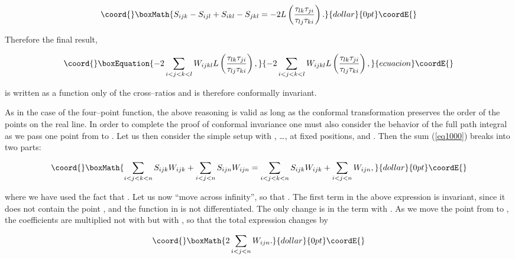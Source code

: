 \documentclass[a4paper,11pt]{article}
\begin{document}
$$\coord{}\boxMath{
S_{ijk}-S_{ijl}+S_{ikl}-S_{jkl}=-2L\left( \frac{\tau _{lk}\tau _{ji}}{\tau
_{lj}\tau _{ki}}\right) .
}{dollar}{0pt}\coordE{}$$

\noindent
Therefore the final result,

\begin{equation}\coord{}\boxEquation{
-2\sum_{i<j<k<l}W_{ijkl}L\left( \frac{\tau _{lk}\tau _{ji}}{\tau _{lj}\tau
_{ki}}\right) ,
}{
-2\sum_{i<j<k<l}W_{ijkl}L\left( \frac{\tau _{lk}\tau _{ji}}{\tau _{lj}\tau
_{ki}}\right) ,
}{ecuacion}\coordE{}\end{equation}

\noindent
is written as a function only of the cross--ratios and is therefore
conformally invariant.

As in the case of the four--point function, the above reasoning is valid as
long as the conformal transformation preserves the order of the points on
the real line. In order to complete the proof of conformal invariance 
one must also consider the behavior of the full path integral as we pass
one point from \myHighlight{$+\infty$}\coordHE{} to \myHighlight{$-\infty$}\coordHE{}. Let us then consider the simple
setup with \coordHE{}, \dots, \coordHE{} at fixed positions, and \coordHE{}. Then the sum (\ref{eq1000}) breaks into two 
parts:

$$\coord{}\boxMath{
\sum_{i<j<k<n}S_{ijk}W_{ijk}+\sum_{i<j<n}S_{ijn}W_{ijn}=
\sum_{i<j<k<n}S_{ijk}W_{ijk}+\sum_{i<j<n}W_{ijn},
}{dollar}{0pt}\coordE{}$$

\noindent
where we have used the fact that \coordHE{}. Let us now
``move \coordHE{} across infinity'', so that \coordHE{}. The first term in the above expression is invariant, since it does not
contain the point \coordHE{}, and the function \coordHE{} in \coordHE{} is not
differentiated. The only change is in the term with \coordHE{}. As we move
the point \coordHE{} from \myHighlight{$+\infty $}\coordHE{} to \myHighlight{$-\infty $}\coordHE{}, the coefficients 
\coordHE{} are multiplied not with \coordHE{} but with \coordHE{}, so that the total expression changes by

$$\coord{}\boxMath{
2\sum_{i<j<n}W_{ijn}.
}{dollar}{0pt}\coordE{}$$
\end{document}

